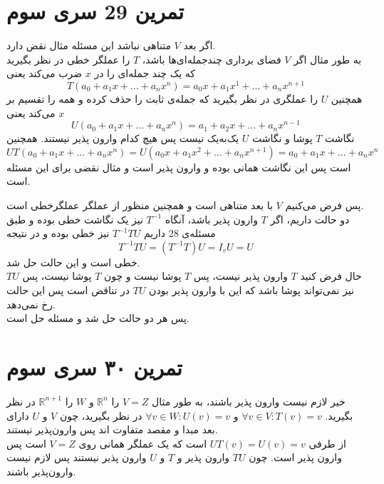 \documentclass[12pt,a4paper]{article}
\begin{document}
\section{تمرین 29 سری سوم}
اگر بعد $V$ متناهی نباشد این مسئله مثال نقض دارد.
\\
به طور مثال اگر $V$ فضای برداری چندجمله‌ای‌ها باشد، $T$ را عملگر خطی در نظر بگیرید که یک چند جمله‌ای را در $x$ ضرب می‌کند یعنی
$$T(a_0 + a_1 x + ... + a_n x^n) = a_0 x + a_1 x^1 + ... + a_n x^{n+1}$$
همچنین $U$ را عملگری در نظر بگیرید که جمله‌ی ثابت را حذف کرده و همه را تقسیم بر $x$ می‌کند یعنی
$$U(a_0 + a_1 x + ... + a_n x^n) = a_1 + a_2 x + ... + a_n x^{n-1}$$
نگاشت $T$ پوشا و نگاشت $U$ یک‌به‌یک نیست پس هیچ کدام وارون پذیر نیستند. همچنین
$$UT(a_0 + a_1 x + ... + a_n x^n) = U(a_0 x + a_1 x^2 + ... + a_n x^{n+1}) = a_0 + a_1 x + ... + a_n x^n$$
است پس این نگاشت همانی بوده و وارون پذیر است و مثال نقضی برای این مسئله است.

پس فرض می‌کنیم $V$ با بعد متناهی است و همچنین منظور از عملگر عملگرخطی است.
\\
دو حالت داریم، اگر $T$ وارون پذیر باشد، آنگاه $T^{-1}$ نیز یک نگاشت خطی بوده و طبق مسئله‌ی 28 داریم $T^{-1}TU$ نیز خطی بوده و در نتیجه
$$T^{-1}TU = (T^{-1}T)U = I_vU = U$$
خطی است و این حالت حل شد.
\\
حال فرض کنید $T$ وارون پذیر نیست، پس $T$ پوشا نیست و چون $T$ پوشا نیست، پس $TU$ نیز نمی‌تواند پوشا باشد که این با وارون پذیر بودن $TU$ در تناقض است پس این حالت رخ نمی‌دهد.
\\
پس هر دو حالت حل شد و مسئله حل است.
\section{تمرین ۳۰ سری سوم}
خیر لازم نیست وارون پذیر باشند، به طور مثال $V = Z$ را 
$\mathbb{R}^n$
و $W$ را
$\mathbb{R}^{n+1}$
در نظر بگیرید.
$\forall v \in V: T(v) = v$
و
$\forall v \in W: U(v) = v$
در نظر بگیرید، چون $V$ و $U$ دارای بعد مبدا و مقصد متفاوت اند پس وارون‌پذیر نیستند.
\\
از طرفی 
$UT(v) = U(v) = v$
است که یک عملگر همانی روی $V=Z$ است پس وارون پذیر است.
چون $TU$ وارون پذیر و $T$ و $U$ وارون پذیر نیستند پس لازم نیست وارون‌پذیر باشند.
\end{document}
